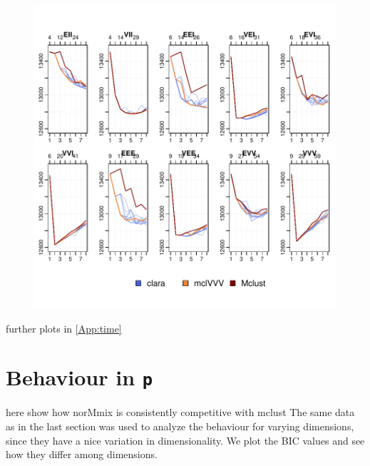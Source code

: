 \begin{figure}[h!]
    \centering
\includegraphics{chapter3-fig20fit}
\end{figure}

further plots in \ref{App:time}


\section{Behaviour in {\tt p}}

here show how norMmix is consistently competitive with mclust
The same data as in the last section was used to analyze the behaviour for 
varying dimensions, since they have a nice variation in dimensionality.
We plot the BIC values and see how they differ among dimensions.

